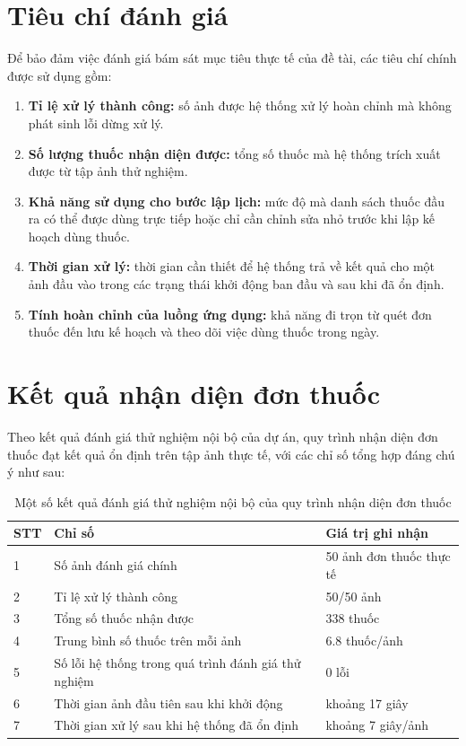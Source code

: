 \documentclass[12pt,a4paper]{report}
\renewcommand{\arraystretch}{1.25}
\begin{document}
\section{Tiêu chí đánh giá}

Để bảo đảm việc đánh giá bám sát mục tiêu thực tế của đề tài, các tiêu chí chính được sử dụng gồm:

\begin{enumerate}[label=\arabic*.]
    \item \textbf{Tỉ lệ xử lý thành công:} số ảnh được hệ thống xử lý hoàn chỉnh mà không phát sinh lỗi dừng xử lý.
    \item \textbf{Số lượng thuốc nhận diện được:} tổng số thuốc mà hệ thống trích xuất được từ tập ảnh thử nghiệm.
    \item \textbf{Khả năng sử dụng cho bước lập lịch:} mức độ mà danh sách thuốc đầu ra có thể được dùng trực tiếp hoặc chỉ cần chỉnh sửa nhỏ trước khi lập kế hoạch dùng thuốc.
    \item \textbf{Thời gian xử lý:} thời gian cần thiết để hệ thống trả về kết quả cho một ảnh đầu vào trong các trạng thái khởi động ban đầu và sau khi đã ổn định.
    \item \textbf{Tính hoàn chỉnh của luồng ứng dụng:} khả năng đi trọn từ quét đơn thuốc đến lưu kế hoạch và theo dõi việc dùng thuốc trong ngày.
\end{enumerate}

\section{Kết quả nhận diện đơn thuốc}

Theo kết quả đánh giá thử nghiệm nội bộ của dự án, quy trình nhận diện đơn thuốc đạt kết quả ổn định trên tập ảnh thực tế, với các chỉ số tổng hợp đáng chú ý như sau:

\begin{table}[htbp]
\centering
\caption{Một số kết quả đánh giá thử nghiệm nội bộ của quy trình nhận diện đơn thuốc}
\label{tab:phase-a-benchmark}
{\renewcommand{\arraystretch}{1.4}
\begin{tabularx}{\textwidth}{C{1.2cm}L{7cm}Y}
\toprule
\textbf{STT} & \textbf{Chỉ số} & \textbf{Giá trị ghi nhận} \\
 & Số ảnh đánh giá chính & 50 ảnh đơn thuốc thực tế \\
2 & Tỉ lệ xử lý thành công & 50/50 ảnh \\
3 & Tổng số thuốc nhận được & 338 thuốc \\
4 & Trung bình số thuốc trên mỗi ảnh & 6.8 thuốc/ảnh \\
5 & Số lỗi hệ thống trong quá trình đánh giá thử nghiệm & 0 lỗi \\
6 & Thời gian ảnh đầu tiên sau khi khởi động & khoảng 17 giây \\
7 & Thời gian xử lý sau khi hệ thống đã ổn định & khoảng 7 giây/ảnh \\
\bottomrule
\end{tabularx}}
\end{table}
\end{document}

